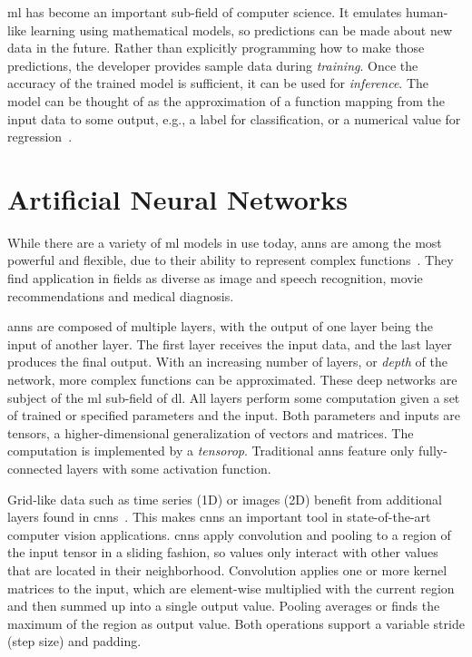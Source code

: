 \Gls{ml} has become an important sub-field of computer science. It emulates human-like learning using mathematical models, so predictions can be made about new data in the future. Rather than explicitly programming how to make those predictions, the developer provides sample data during \textit{training}. Once the accuracy of the trained model is sufficient, it can be used for \textit{inference}. The model can be thought of as the approximation of a function mapping from the input data to some output, e.g., a label for classification, or a numerical value for regression~\cite[p.~164]{IanGoodfellow.2016}.

\section{Artificial Neural Networks}
While there are a variety of \gls{ml} models in use today, \glspl{ann} are among the most powerful and flexible, due to their ability to represent complex functions~\cite[p.~163]{IanGoodfellow.2016}. They find application in fields as diverse as image and speech recognition, movie recommendations and medical diagnosis.

\Glspl{ann} are composed of multiple layers, with the output of one layer being the input of another layer. The first layer receives the input data, and the last layer produces the final output. With an increasing number of layers, or \textit{depth} of the network, more complex functions can be approximated. These deep networks are subject of the \gls{ml} sub-field of \acrfull{dl}. All layers perform some computation given a set of trained or specified parameters and the input. Both parameters and inputs are \glspl{tensor}, a higher-dimensional generalization of vectors and matrices. The computation is implemented by a \textit{\gls{tensorop}}. Traditional \glspl{ann} feature only fully-connected layers with some activation function.

Grid-like data such as time series (1D) or images (2D) benefit from additional layers found in \glspl{cnn}~\cite[p.~326]{IanGoodfellow.2016}. This makes \glspl{cnn} an important tool in state-of-the-art computer vision applications. \Glspl{cnn} apply convolution and pooling to a region of the input tensor in a sliding fashion, so values only interact with other values that are located in their neighborhood. Convolution applies one or more kernel matrices to the input, which are element-wise multiplied with the current region and then summed up into a single output value. Pooling averages or finds the maximum of the region as output value. Both operations support a variable stride (step size) and padding.

